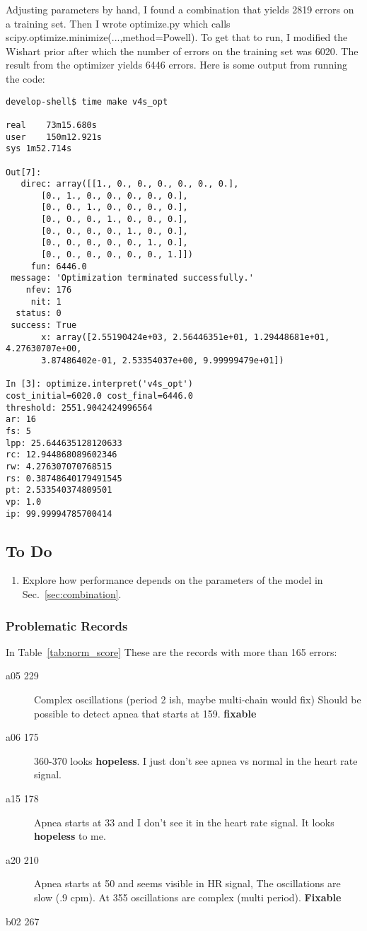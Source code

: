 \documentclass[12pt]{article}
\begin{document}
Adjusting parameters by hand, I found a combination that yields 2819
errors on a training set.  Then I wrote optimize.py which calls
scipy.optimize.minimize(...,method=Powell).  To get that to run, I
modified the Wishart prior after which the number of errors on the
training set was 6020.  The result from the optimizer yields 6446
errors.  Here is some output from running the code:
\begin{verbatim}
develop-shell$ time make v4s_opt 

real	73m15.680s
user	150m12.921s
sys	1m52.714s

Out[7]: 
   direc: array([[1., 0., 0., 0., 0., 0., 0.],
       [0., 1., 0., 0., 0., 0., 0.],
       [0., 0., 1., 0., 0., 0., 0.],
       [0., 0., 0., 1., 0., 0., 0.],
       [0., 0., 0., 0., 1., 0., 0.],
       [0., 0., 0., 0., 0., 1., 0.],
       [0., 0., 0., 0., 0., 0., 1.]])
     fun: 6446.0
 message: 'Optimization terminated successfully.'
    nfev: 176
     nit: 1
  status: 0
 success: True
       x: array([2.55190424e+03, 2.56446351e+01, 1.29448681e+01, 4.27630707e+00,
       3.87486402e-01, 2.53354037e+00, 9.99999479e+01])

In [3]: optimize.interpret('v4s_opt')
cost_initial=6020.0 cost_final=6446.0
threshold: 2551.9042424996564
ar: 16
fs: 5
lpp: 25.644635128120633
rc: 12.944868089602346
rw: 4.276307070768515
rs: 0.38748640179491545
pt: 2.533540374809501
vp: 1.0
ip: 99.99994785700414
\end{verbatim}

\subsection{To Do}

\begin{enumerate}
\item Explore how performance depends on the parameters of the model
  in Sec.~\ref{sec:combination}.
\end{enumerate}

\subsubsection{Problematic Records}
\label{sec:problematic_records}

In Table~\ref{tab:norm_score} These are the records with more than 165
errors:
\begin{description}
\item[a05 229] Complex oscillations (period 2 ish, maybe multi-chain would
  fix) Should be possible to detect apnea that starts at 159.
  \textbf{fixable}
\item[a06 175] 360-370 looks \textbf{hopeless}.  I just don't see apnea vs
  normal in the heart rate signal.
\item[a15 178] Apnea starts at 33 and I don't see it in the heart rate
  signal.  It looks \textbf{hopeless} to me.
\item[a20 210] Apnea starts at 50 and seems visible in HR signal,  The
  oscillations are slow (.9 cpm).  At 355 oscillations are complex
  (multi period).  \textbf{Fixable}
\item[b02 267] 
\end{description}
\end{document}
